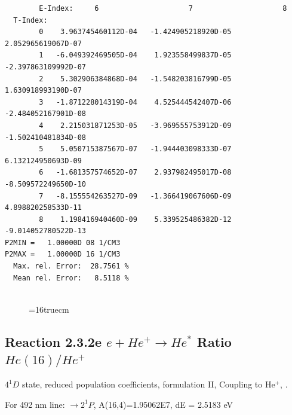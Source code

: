 \documentclass[12pt,dvipdfmx]{article}
\begin{document}
\begin{small}
\begin{verbatim}
        E-Index:     6                     7                     8
  T-Index:
        0    3.963745460112D-04   -1.424905218920D-05    2.052965619067D-07
        1   -6.049392469505D-04    1.923558499837D-05   -2.397863109992D-07
        2    5.302906384868D-04   -1.548203816799D-05    1.630918993190D-07
        3   -1.871228014319D-04    4.525444542407D-06   -2.484052167901D-08
        4    2.215031871253D-05   -3.969555753912D-09   -1.502410481834D-08
        5    5.050715387567D-07   -1.944403098333D-07    6.132124950693D-09
        6   -1.681357574652D-07    2.937982495017D-08   -8.509572249650D-10
        7   -8.155554263527D-09   -1.366419067606D-09    4.898820258533D-11
        8    1.198416940460D-09    5.339525486382D-12   -9.014052780522D-13
P2MIN =   1.00000D 08 1/CM3
P2MAX =   1.00000D 16 1/CM3
  Max. rel. Error:  28.7561 %
  Mean rel. Error:   8.5118 %


\end{verbatim}\end{small}
\begin{figure} \label{2.3.2d}
\epsfxsize=16truecm
\end{figure}
\newpage


\subsection{
  Reaction 2.3.2e $e + He^+ \rightarrow He^*  $ Ratio $He(16)/He^+$
}

  $4^1D$ state,
  reduced population coefficients, formulation II,
  Coupling to He$^+$, \cite{kn:Fujimoto}.

  For 492 nm line: $\rightarrow 2^1P$, A(16,4)=1.95062E7, dE = 2.5183 eV
\end{document}
